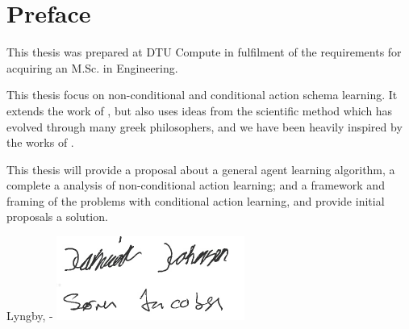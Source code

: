 \chapter{Preface}

This thesis was prepared at DTU Compute in fulfilment of the requirements for acquiring an M.Sc. in Engineering.

This thesis focus on non-conditional and conditional action schema learning.
It extends the work of \cite{Walsh2008}, but also uses ideas from the scientific method which has evolved through many greek philosophers, and we have been heavily inspired by the works of \cite{popper1959a}.

This thesis will provide a proposal about a general agent learning algorithm, a complete a analysis of non-conditional action learning; and a framework and framing of the problems with conditional action learning, and provide initial proposals a solution.
\vspace{20mm}
\begin{center}
    \hspace{20mm} Lyngby, \thesishandin-\thesisyear
    \vspace{5mm}
    \newline
    \includegraphics[scale=0.8]{Graphics/signatures}
\end{center}
\begin{flushright}
    \thesisauthor
\end{flushright}
